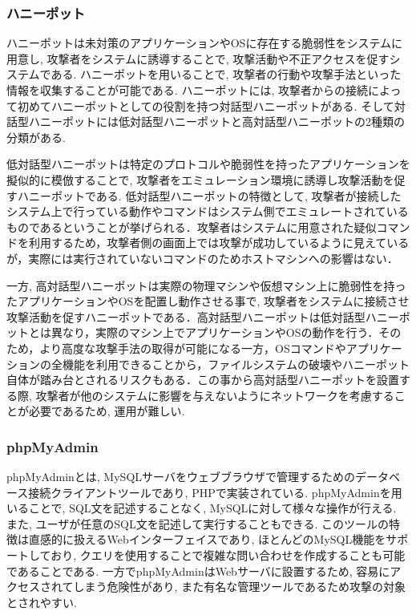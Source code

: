 \documentclass[submit,techrep,noauthor]{ipsj}
\begin{document}
\subsubsection{ハニーポット}
ハニーポットは未対策のアプリケーションやOSに存在する脆弱性をシステムに用意し, 攻撃者をシステムに誘導することで, 攻撃活動や不正アクセスを促すシステムである. ハニーポットを用いることで, 攻撃者の行動や攻撃手法といった情報を収集することが可能である.
ハニーポットには, 攻撃者からの接続によって初めてハニーポットとしての役割を持つ対話型ハニーポットがある. そして対話型ハニーポットには低対話型ハニーポットと高対話型ハニーポットの2種類の分類がある.\par
低対話型ハニーポットは特定のプロトコルや脆弱性を持ったアプリケーションを擬似的に模倣することで, 攻撃者をエミュレーション環境に誘導し攻撃活動を促すハニーポットである. 低対話型ハニーポットの特徴として, 攻撃者が接続したシステム上で行っている動作やコマンドはシステム側でエミュレートされているものであるということが挙げられる．攻撃者はシステムに用意された疑似コマンドを利用するため，攻撃者側の画面上では攻撃が成功しているように見えているが，実際には実行されていないコマンドのためホストマシンへの影響はない．\par
一方, 高対話型ハニーポットは実際の物理マシンや仮想マシン上に脆弱性を持ったアプリケーションやOSを配置し動作させる事で, 攻撃者をシステムに接続させ攻撃活動を促すハニーポットである．高対話型ハニーポットは低対話型ハニーポットとは異なり，実際のマシン上でアプリケーションやOSの動作を行う．そのため，より高度な攻撃手法の取得が可能になる一方，OSコマンドやアプリケーションの全機能を利用できることから，ファイルシステムの破壊やハニーポット自体が踏み台とされるリスクもある．この事から高対話型ハニーポットを設置する際, 攻撃者が他のシステムに影響を与えないようにネットワークを考慮することが必要であるため, 運用が難しい.

\subsubsection{phpMyAdmin}
phpMyAdminとは, MySQLサーバをウェブブラウザで管理するためのデータベース接続クライアントツールであり, PHPで実装されている. phpMyAdminを用いることで, SQL文を記述することなく, MySQLに対して様々な操作が行える. また, ユーザが任意のSQL文を記述して実行することもできる. このツールの特徴は直感的に扱えるWebインターフェイスであり, ほとんどのMySQL機能をサポートしており, クエリを使用することで複雑な問い合わせを作成することも可能であることである. 一方でphpMyAdminはWebサーバに設置するため, 容易にアクセスされてしまう危険性があり, また有名な管理ツールであるため攻撃の対象とされやすい.
\end{document}
